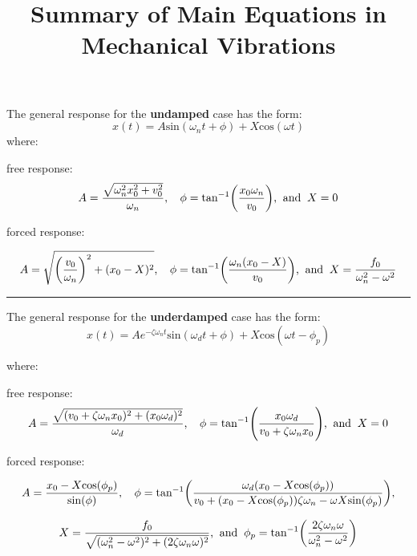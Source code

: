 \documentclass[12pt,a4paper]{article}
\begin{document}
	
	\large{}
	
	\title{\vspace{-2cm} Summary of Main Equations in Mechanical Vibrations}
	\date{}
	\maketitle
	
The general response for the \textbf{undamped} case has the form:
\begin{equation*}
	x(t) = A \text{sin}(\omega_n t + \phi) + X \text{cos}(\omega t)
\end{equation*}	
where:

free response:
\begin{equation*}
	A = \frac{\sqrt{\omega_n^2x_0^2+v_0^2}}{\omega_n} \text{,\;\;\;\;} \phi = \text{tan}^{-1}\bigg(\frac{x_0\omega_n}{v_0}\bigg) \text{,\;\;and\;\;} X=0
\end{equation*}

forced response:

\begin{equation*}
	A = \sqrt{\bigg(\frac{v_0}{\omega_n}\bigg)^2+(x_0-X)^2} \text{,\;\;\;\;} \phi = \text{tan}^{-1}\bigg(\frac{\omega_n(x_0-X)}{v_0}\bigg) \text{,\;\;and\;\;} X=\frac{f_0}{\omega_n^2-\omega^2}
\end{equation*}

\noindent\rule{\textwidth}{1pt}
The general response for the \textbf{underdamped} case has the form:
\begin{equation*}
	x(t) = A e^{-\zeta \omega_n t}\text{sin}(\omega_d t + \phi) + X \text{cos}(\omega t - \phi_p)
\end{equation*}	
		
		
where:

free response:
\begin{equation*}
	A = \frac{\sqrt{(v_0+\zeta\omega_nx_0)^2 + (x_0\omega_d)^2}}{\omega_d} \text{,\;\;\;\;} \phi = \text{tan}^{-1}\Bigg(\frac{x_0\omega_d}{v_0+\zeta\omega_nx_0}\Bigg)  \text{,\;\;and\;\;} X=0
\end{equation*}

forced response:

\begin{equation*}
	A = \frac{x_0 -X \text{cos}(\phi_p)}{\text{sin}(\phi)} \text{,\;\;\;\;} \phi = \text{tan}^{-1}\bigg(\frac{\omega_d ( x_0 -X \text{cos}(\phi_p))}{v_0 + (x_0 - X \text{cos}(\phi_p)) \zeta \omega_n - \omega X \text{sin}(\phi_p) }\bigg),
\end{equation*}

\begin{equation*}
	X = \frac{f_0}{\sqrt{(\omega_n^2 - \omega^2)^2 +  (2\zeta \omega_n \omega)^2}}  \text{,\;\;and\;\;} \phi_p = \text{tan}^{-1}\bigg(\frac{2\zeta \omega_n \omega}{\omega_n^2 - \omega^2}\bigg)
\end{equation*}
\end{document}
